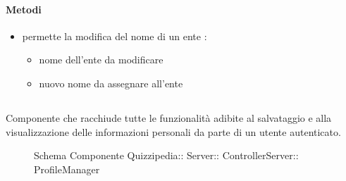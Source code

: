 \paragraph{Metodi}
\begin{itemize}
\item {}
\newline
permette la modifica del nome di un ente
\newline
{} :
\begin{itemize}
\item {}
\newline
nome dell'ente da modificare
\item {}
\newline
nuovo nome da assegnare all'ente
\end{itemize}
\end{itemize}
\subsection{}
Componente che racchiude tutte le funzionalità adibite al salvataggio e alla visualizzazione delle informazioni personali da parte di un utente autenticato.
\begin{figure}[H]
\centering
\noindent{}
\caption[Schema Componente Quizzipedia::Server::ControllerServer::ProfileManager]{Schema Componente Quizzipedia:: Server:: ControllerServer:: ProfileManager}
\end{figure}
